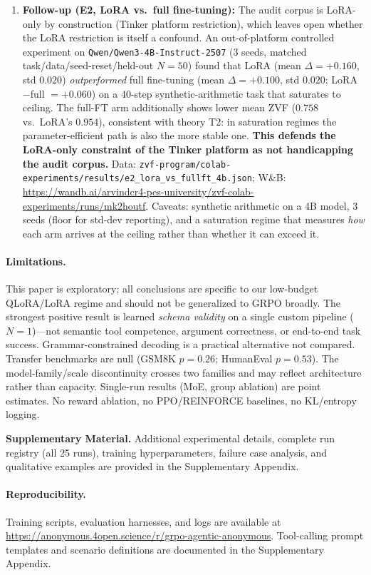 \documentclass{article}
\begin{document}
\begin{enumerate}
    \item \textbf{Follow-up (E2, LoRA vs.\ full fine-tuning):} The audit corpus is LoRA-only by construction (Tinker platform restriction), which leaves open whether the LoRA restriction is itself a confound. An out-of-platform controlled experiment on \texttt{Qwen/Qwen3-4B-Instruct-2507} (3 seeds, matched task/data/seed-reset/held-out $N{=}50$) found that LoRA (mean $\Delta{=}+0.160$, std $0.020$) \emph{outperformed} full fine-tuning (mean $\Delta{=}+0.100$, std $0.020$; LoRA$-$full $= +0.060$) on a 40-step synthetic-arithmetic task that saturates to ceiling. The full-FT arm additionally shows lower mean ZVF ($0.758$ vs.\ LoRA's $0.954$), consistent with theory T2: in saturation regimes the parameter-efficient path is also the more stable one. \textbf{This defends the LoRA-only constraint of the Tinker platform as not handicapping the audit corpus.} Data: \texttt{zvf-program/colab-experiments/results/e2\_lora\_vs\_fullft\_4b.json}; W\&B: \url{https://wandb.ai/arvindcr4-pes-university/zvf-colab-experiments/runs/mk2houtf}. Caveats: synthetic arithmetic on a 4B model, 3 seeds (floor for std-dev reporting), and a saturation regime that measures \emph{how} each arm arrives at the ceiling rather than whether it can exceed it.
\end{enumerate}

\paragraph{Limitations.} This paper is exploratory; all conclusions are specific to our low-budget QLoRA/LoRA regime and should not be generalized to GRPO broadly. The strongest positive result is learned \emph{schema validity} on a single custom pipeline ($N{=}1$)---not semantic tool competence, argument correctness, or end-to-end task success. Grammar-constrained decoding is a practical alternative not compared. Transfer benchmarks are null (GSM8K $p{=}0.26$; HumanEval $p{=}0.53$). The model-family/scale discontinuity crosses two families and may reflect architecture rather than capacity. Single-run results (MoE, group ablation) are point estimates. No reward ablation, no PPO/REINFORCE baselines, no KL/entropy logging.

\medskip

\textbf{Supplementary Material.} Additional experimental details, complete run registry (all 25 runs), training hyperparameters, failure case analysis, and qualitative examples are provided in the Supplementary Appendix.

\paragraph{Reproducibility.} Training scripts, evaluation harnesses, and logs are available at \url{https://anonymous.4open.science/r/grpo-agentic-anonymous}. Tool-calling prompt templates and scenario definitions are documented in the Supplementary Appendix.



\end{document}
